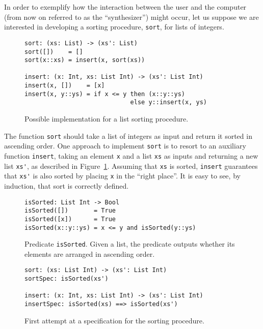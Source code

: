 In order to exemplify how the interaction between the user and the computer
(from now on referred to as the ``synthesizer'') might occur, let us suppose we
are interested in developing a sorting procedure, \verb|sort|, for lists of
integers.

\begin{figure}[h]
  \centering
\begin{verbatim}
sort: (xs: List) -> (xs': List)
sort([])    = []
sort(x::xs) = insert(x, sort(xs))

insert: (x: Int, xs: List Int) -> (xs': List Int)
insert(x, [])    = [x]
insert(x, y::ys) = if x <= y then (x::y::ys)
                             else y::insert(x, ys)
\end{verbatim}
  \caption{Possible implementation for a list sorting procedure.}
  \label{fig:sort-impl}
\end{figure}

The function \verb|sort| should take a list of integers as input and return it
sorted in ascending order. One approach to implement \verb|sort| is to resort to
an auxiliary function \verb|insert|, taking an element \verb|x| and a list
\verb|xs| as inputs and returning a new list \verb|xs'|, as described in
Figure~\ref{fig:sort-impl}. Assuming that \verb|xs| is sorted, \verb|insert|
guarantees that \verb|xs'| is also sorted by placing \verb|x| in the ``right
place''. It is easy to see, by induction, that sort is correctly defined.

\begin{figure}[h]
  \centering
\begin{verbatim}
isSorted: List Int -> Bool
isSorted([])       = True
isSorted([x])      = True
isSorted(x::y::ys) = x <= y and isSorted(y::ys)
\end{verbatim}
  \cprotect\caption{Predicate \verb|isSorted|. Given a list, the predicate
    outputs whether its elements are arranged in ascending order.}
  \label{fig:is-sorted-pred}
\end{figure}

\begin{figure}[h]
  \centering
\begin{verbatim}
sort: (xs: List Int) -> (xs': List Int)
sortSpec: isSorted(xs')

insert: (x: Int, xs: List Int) -> (xs': List Int)
insertSpec: isSorted(xs) ==> isSorted(xs')
\end{verbatim}
  \caption{First attempt at a specification for the sorting procedure.}
  \label{fig:sort-spec-1}
\end{figure}

